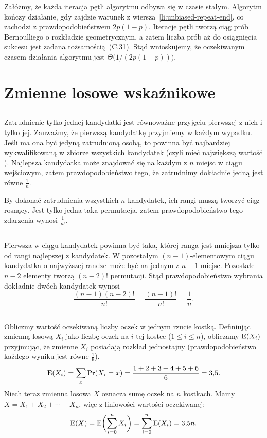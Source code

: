 Załóżmy, że każda iteracja pętli algorytmu odbywa się w czasie stałym. Algorytm kończy działanie, gdy zajdzie warunek z wiersza~\ref{li:unbiased-repeat-end}, co zachodzi z prawdopodobieństwem $2p(1-p)$. Iteracje pętli tworzą ciąg prób Bernoulliego o rozkładzie geometrycznym, a zatem liczba prób aż do osiągnięcia sukcesu jest zadana tożsamością~(C.31). Stąd wnioskujemy, że oczekiwanym czasem działania algorytmu jest $\Theta\bigl(1/(2p(1-p))\bigr)$.

\section{Zmienne losowe wskaźnikowe}

\subsection{} %
Zatrudnienie tylko jednej kandydatki jest równoważne przyjęciu pierwszej z nich i tylko jej. Zauważmy, że pierwszą kandydatkę przyjmiemy w każdym wypadku. Jeśli ma ona być jedyną zatrudnioną osobą, to powinna być najbardziej wykwalifikowaną w zbiorze wszystkich kandydatek (czyli mieć największą wartość ). Najlepsza kandydatka może znajdować się na każdym z $n$ miejsc w ciągu wejściowym, zatem prawdopodobieństwo tego, że zatrudnimy dokładnie jedną jest równe $\frac{1}{n}$.

By dokonać zatrudnienia wszystkich $n$ kandydatek, ich rangi muszą tworzyć ciąg rosnący. Jest tylko jedna taka permutacja, zatem prawdopodobieństwo tego zdarzenia wynosi $\frac{1}{n!}$. 

\subsection{} %
Pierwsza w ciągu kandydatek powinna być taka, której ranga jest mniejsza tylko od rangi najlepszej z kandydatek. W pozostałym $(n-1)$-elementowym ciągu kandydatka o najwyższej randze może być na jednym z $n-1$ miejsc. Pozostałe $n-2$ elementy tworzą $(n-2)!$ permutacji. Stąd prawdopodobieństwo wybrania dokładnie dwóch kandydatek wynosi
\[
	\frac{(n-1)(n-2)!}{n!} = \frac{(n-1)!}{n!} = \frac{1}{n}.
\]

\subsection{} %
Obliczmy wartość oczekiwaną liczby oczek w jednym rzucie kostką. Definiując zmienną losową $X_i$ jako liczbę oczek na $i$-tej kostce ($1\le i\le n$), obliczamy $\operatorname{E}(X_i)$ przyjmując, że zmienne $X_i$ posiadają rozkład jednostajny (prawdopodobieństwo każdego wyniku jest równe $\frac{1}{6}$).
\[
	\operatorname{E}(X_i) = \sum_x\Pr(X_i=x) = \frac{1+2+3+4+5+6}{6} = 3{,}5.
\]
Niech teraz zmienna losowa $X$ oznacza sumę oczek na $n$ kostkach. Mamy $X=X_1+X_2+\cdots+X_n$, więc z liniowości wartości oczekiwanej:
\[
	\operatorname{E}(X) = \operatorname{E}\biggl(\sum_{i=0}^nX_i\biggr) = \sum_{i=0}^n\operatorname{E}(X_i) = 3{,}5n.
\]

